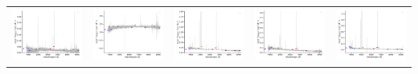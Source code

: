 \begin{center}
\begin{longtable}{l l l l l }
    \includegraphics[width=0.19\linewidth, clip]{Figs/Figs-sdss/spec-1103-52873-0382-STRIPE82-0136-022276.pdf} & \includegraphics[width=0.19\linewidth, clip]{Figs/Figs-sdss/spec-1103-52873-0393-STRIPE82-0136-015923.pdf} & \includegraphics[width=0.19\linewidth, clip]{Figs/Figs-sdss/spec-1106-52912-0102-SPLUS-s02s05-046746.pdf} & \includegraphics[width=0.19\linewidth, clip]{Figs/Figs-sdss/spec-1106-52912-0194-STRIPE82-0129-031160.pdf} & \includegraphics[width=0.19\linewidth, clip]{Figs/Figs-sdss/spec-1106-52912-0456-STRIPE82-0130-042161.pdf} \\

\end{longtable}
\end{center}

